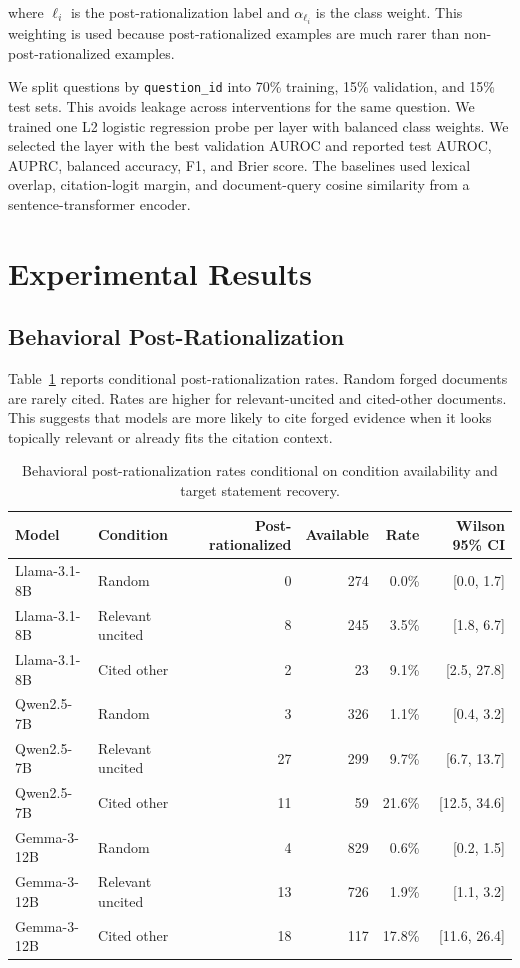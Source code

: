 \documentclass[11pt]{article}
\begin{document}
where $\ell_i$ is the post-rationalization label and $\alpha_{\ell_i}$ is the class weight. This weighting is used because post-rationalized examples are much rarer than non-post-rationalized examples.

We split questions by \texttt{question\_id} into 70\% training, 15\% validation, and 15\% test sets. This avoids leakage across interventions for the same question. We trained one L2 logistic regression probe per layer with balanced class weights. We selected the layer with the best validation AUROC and reported test AUROC, AUPRC, balanced accuracy, F1, and Brier score. The baselines used lexical overlap, citation-logit margin, and document-query cosine similarity from a sentence-transformer encoder.

\section{Experimental Results}
\label{sec:results}

\subsection{Behavioral Post-Rationalization}

Table~\ref{tab:behavioral} reports conditional post-rationalization rates. Random forged documents are rarely cited. Rates are higher for relevant-uncited and cited-other documents. This suggests that models are more likely to cite forged evidence when it looks topically relevant or already fits the citation context.

\begin{table}[t]
\centering
\small
\begin{tabular}{llrrrr}
\toprule
Model & Condition & Post-rationalized & Available & Rate & Wilson 95\% CI \\
\midrule
Llama-3.1-8B & Random & 0 & 274 & 0.0\% & [0.0, 1.7] \\
Llama-3.1-8B & Relevant uncited & 8 & 245 & 3.5\% & [1.8, 6.7] \\
Llama-3.1-8B & Cited other & 2 & 23 & 9.1\% & [2.5, 27.8] \\
\midrule
Qwen2.5-7B & Random & 3 & 326 & 1.1\% & [0.4, 3.2] \\
Qwen2.5-7B & Relevant uncited & 27 & 299 & 9.7\% & [6.7, 13.7] \\
Qwen2.5-7B & Cited other & 11 & 59 & 21.6\% & [12.5, 34.6] \\
\midrule
Gemma-3-12B & Random & 4 & 829 & 0.6\% & [0.2, 1.5] \\
Gemma-3-12B & Relevant uncited & 13 & 726 & 1.9\% & [1.1, 3.2] \\
Gemma-3-12B & Cited other & 18 & 117 & 17.8\% & [11.6, 26.4] \\
\bottomrule
\end{tabular}
\caption{Behavioral post-rationalization rates conditional on condition availability and target statement recovery.}
\label{tab:behavioral}
\end{table}
\end{document}
